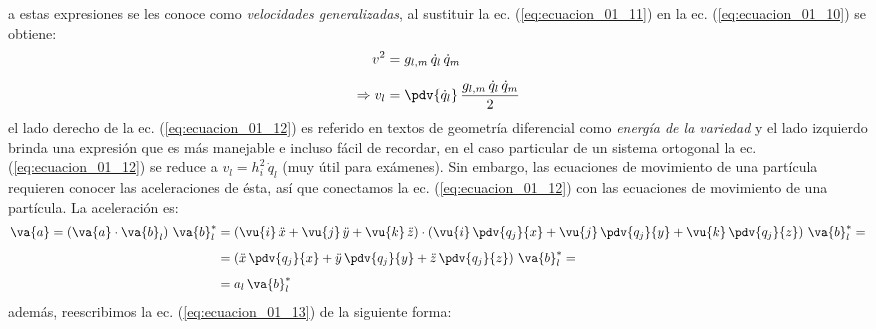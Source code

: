 a estas expresiones se les conoce como \emph{velocidades generalizadas}, al sustituir la ec. (\ref{eq:ecuacion_01_11}) en la ec. (\ref{eq:ecuacion_01_10}) se obtiene:
\begin{align}
\begin{aligned}[b]
v^{2} &= g_{l,m} \, \dot{q}_{l} \, \dot{q}_{m} \\[0.5em]
\Rightarrow v_{l} &= \pdv{\dot{q}_{l}} \, \dfrac{g_{l,m} \, \dot{q}_{l} \, \dot{q}_{m}}{2}
\end{aligned}
\label{eq:ecuacion_01_12}
\end{align}
el lado derecho de la ec. (\ref{eq:ecuacion_01_12}) es referido en textos de geometría diferencial como \emph{energía de la variedad} y el lado izquierdo brinda una expresión que es más manejable e incluso fácil de recordar, en el caso particular de un sistema ortogonal la ec. (\ref{eq:ecuacion_01_12}) se reduce a $v_{l} = h_{i}^{2} \, \dot{q}_{l}$ (muy útil para exámenes). Sin embargo, las ecuaciones de movimiento de una partícula requieren conocer las aceleraciones de ésta, así que conectamos la ec. (\ref{eq:ecuacion_01_12}) con las ecuaciones de movimiento de una partícula. La aceleración es:
\begin{align}
\begin{aligned}[b]
\va{a} = \left( \va{a} \cdot \va{b}_{l} \right) \, \va{b}_{l}^{*} &= \left( \vu{i} \, \ddot{x} + \vu{j} \, \ddot{y} + \vu{k} \, \ddot{z} \right) \cdot \left( \vu{i} \, \pdv{q_{j}}{x} + \vu{j} \, \pdv{q_{j}}{y} + \vu{k} \, \pdv{q_{j}}{z} \right) \, \va{b}_{l}^{*} = \\[0.5em]
&= \left( \ddot{x} \, \pdv{q_{j}}{x} + \ddot{y} \, \pdv{q_{j}}{y} + \ddot{z} \, \pdv{q_{j}}{z} \right) \, \va{b}_{l}^{*} = \\[0.5em]
&= a_{l} \, \va{b}_{l}^{*}
\end{aligned}
\label{eq:ecuacion_01_13}
\end{align}
además, reescribimos la ec. (\ref{eq:ecuacion_01_13}) de la siguiente forma:
